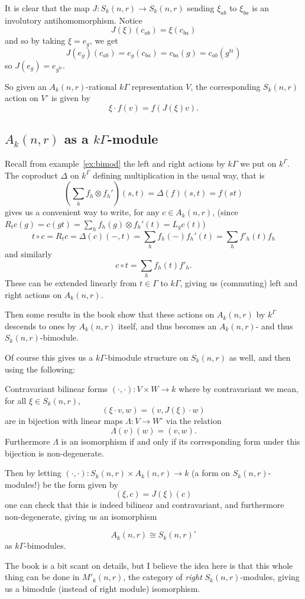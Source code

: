 \documentclass[12pt]{article}
\DeclareMathOperator{\1}{\mathbbm{1}}
\begin{document}
It is clear that the map $J:S_k(n,r)\to S_k(n,r)$ sending $\xi_{ab}$ to $\xi_{ba}$ is an involutory antihomomorphism.
Notice 
\[J(\xi)(c_{ab})=\xi(c_{ba})\]
and so by taking $\xi=e_g$, we get 
\[J(e_g)(c_{ab})=e_g(c_{ba})=c_{ba}(g)=c_{ab}(g^{\text{tr}})\]
so $J(e_g)=e_{g^{\text{tr}}}$.

So given an $A_k(n,r)$-rational $k\Gamma$ representation $V$, the corresponding $S_k(n,r)$ action on $V^\circ$ is given by 
\[\xi\cdot f (v)=f(J(\xi)v).\]

\subsection{\texorpdfstring{$A_k(n,r)$}{Ak(n,r)} as a \texorpdfstring{$k\Gamma$}{kGamma}-module}
Recall from example~\ref{ex:bimod} the left and right actions by $k\Gamma$ we put on $k^\Gamma$. The coproduct $\Delta$ on $k^\Gamma$
defining multiplication in the usual way, that is
\[\left(\sum_h f_h\otimes f_h'\right)(s,t)=\Delta(f)(s,t)=f(st)\]
gives us a convenient way to write, for any $c\in A_k(n,r)$, (since $R_tc(g)=c(gt)=\sum_h f_h(g)\otimes f_h'(t)=L_g c(t)$)
\[t\circ c= R_t c=\Delta(c)(-,t)=\sum_h f_h(-)f_h'(t)=\sum_h f'_h(t)f_h\]
and similarly
\[c\circ t=\sum_h f_h(t)f'_h.\]
These can be extended linearly from $t\in\Gamma$ to $k\Gamma$, giving us (commuting) left and right actions on $A_k(n,r)$.

Then some results in the book show that these actions on $A_k(n,r)$ by $k^\Gamma$ descends to ones by $A_k(n,r)$ itself, 
and thus becomes an $A_k(n,r)$- and thus $S_k(n,r)$-bimodule.

Of course this gives us a $k\Gamma$-bimodule structure on $S_k(n,r)$ as well, and then using the following:
\begin{thm}\label{thm:bil-forms}
	Contravariant bilinear forms $(\cdot,\cdot):V\times W\to k$ where by contravariant we mean, for all $\xi\in S_k(n,r)$,
	\[(\xi\cdot v,w)=(v,J(\xi)\cdot w)\]
	are in bijection with linear maps $\Lambda:V\to W^\circ$ via the relation 
	\[\Lambda(v)(w)=(v,w).\]
	Furthermore $\Lambda$ is an isomorphism if and only if its corresponding form under this bijection is non-degenerate.
\end{thm}
Then by letting $(\cdot,\cdot):S_k(n,r)\times A_k(n,r)\to k$ (a form on $S_k(n,r)$-modules!) be the form given by 
\[(\xi, c)=J(\xi)(c)\]
one can check that this is indeed bilinear and contravariant, and furthermore non-degenerate, giving us an isomorphism 
\begin{cor}
	\[A_k(n,r)\cong S_k(n,r)^\circ\]
	as $k\Gamma$-bimodules.
\end{cor}
\begin{rmk}
	The book is a bit scant on details, but I believe the idea here is that this whole thing can be done in $M'_k(n,r)$, the 
	category of \textit{right} $S_k(n,r)$-modules, giving us a bimodule (instead of right module) isomorphism.
\end{rmk}
\end{document}
